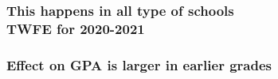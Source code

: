 \documentclass{beamer}
\begin{document}
\begin{frame}
        \label{frame:robustness}
        \frametitle{This happens in all type of schools \\ {\tiny TWFE for 2020-2021}}
  {
}   %
\end{frame}


\begin{frame}
    \label{frame:twfe_gpa_2_4_6_8}
    \frametitle{Effect on GPA is larger in earlier grades}
        {
    }
\end{frame}
\end{document}
